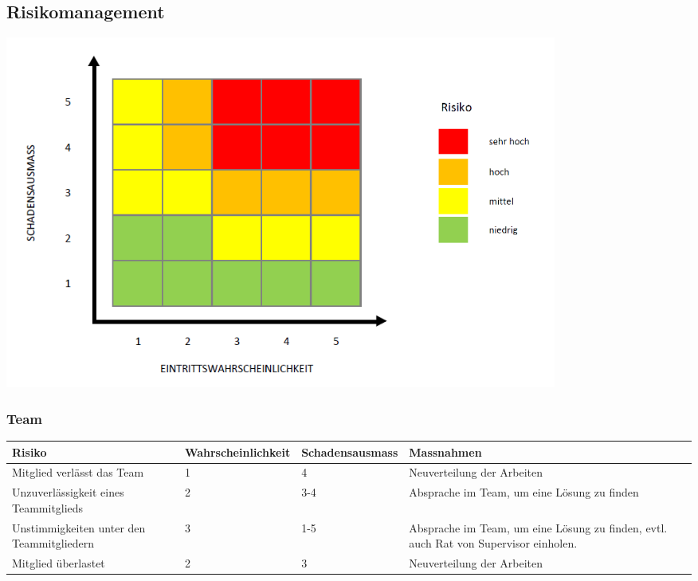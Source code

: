 \subsection{Risikomanagement}

\includegraphics[width=0.8\textwidth]{Images/risikomatrix.png}

\subsubsection{Team}
\begin{table}[htbp]
\begin{tabular}{|p{3cm}|p{3cm}|p{3cm}|p{4cm}|}\hline
	
	\textbf{Risiko}	& 	\textbf{Wahrscheinlichkeit} & \textbf{Schadensausmass}  & \textbf{Massnahmen} \\\hline
	

	Mitglied verlässt das Team	&	1	&	4	&	Neuverteilung der Arbeiten \\\hline
	Unzuverlässigkeit eines Teammitglieds	&	2	&	3-4	&	 Absprache im Team, um eine Lösung zu finden  \\\hline
	Unstimmigkeiten unter den Teammitgliedern	& 	3	&	1-5	& Absprache im Team, um eine Lösung zu finden, evtl. auch Rat von Supervisor einholen.  \\\hline
	Mitglied überlastet	&	2	&	3	&	Neuverteilung der Arbeiten \\\hline
\end{tabular}\\
\end{table}

